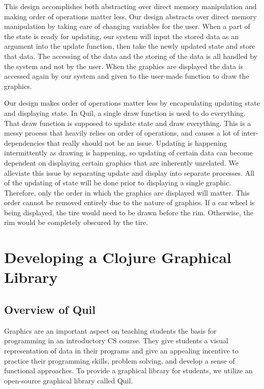 \documentclass[12pt]{article}
\newcommand{\comment}[1]{{\bf \tt  {#1}}}
\newcommand{\todo}[1]{\textcolor{blue}{\comment{To Do: {#1}}}}
\begin{document}
This design accomplishes both abstracting over direct memory manipulation and making order of operations matter less. Our design abstracts over direct memory manipulation by taking care of changing variables for the user. When a part of the state is ready for updating, our system will input the stored data as an argument into the update function, then take the newly updated state and store that data. The accessing of the data and the storing of the data is all handled by the system and not by the user. When the graphics are displayed the data is accessed again by our system and given to the user-made function to draw the graphics. 

Our design makes order of operations matter less by encapsulating updating state and displaying state. In Quil, a single draw function is used to do everything. That draw function is supposed to update state and draw everything. This is a messy process that heavily relies on order of operations, and causes a lot of inter-dependencies that really should not be an issue. Updating is happening intermittently as drawing is happening, so updating of certain data can become dependent on displaying certain graphics that are inherently unrelated. We alleviate this issue by separating update and display into separate processes. All of the updating of state will be done prior to displaying a single graphic. Therefore, only the order in which the graphics are displayed will matter. This order cannot be removed entirely due to the nature of graphics. If a car wheel is being displayed, the tire would need to be drawn before the rim. Otherwise, the rim would be completely obscured by the tire.

\section{Developing a Clojure Graphical Library}\label{sec:library}



\subsection{Overview of Quil}\label{subsec:quil}
Graphics are an important aspect on teaching students the basis for programming in an introductory CS course. They give students a visual representation of data in their programs and give an appealing incentive to practice their programming skills, problem solving, and develop a sense of functional approaches. To provide a graphical library for students, we utilize an open-source graphical library called Quil.
\end{document}
